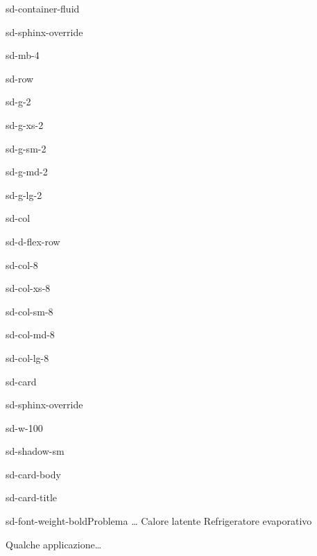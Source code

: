 \documentclass[letterpaper,10pt,italian]{jupyterBook}
\begin{document}
\begin{sphinxuseclass}{sd-container-fluid}
\begin{sphinxuseclass}{sd-sphinx-override}
\begin{sphinxuseclass}{sd-mb-4}
\begin{sphinxuseclass}{sd-row}
\begin{sphinxuseclass}{sd-g-2}
\begin{sphinxuseclass}{sd-g-xs-2}
\begin{sphinxuseclass}{sd-g-sm-2}
\begin{sphinxuseclass}{sd-g-md-2}
\begin{sphinxuseclass}{sd-g-lg-2}
\begin{sphinxuseclass}{sd-col}
\begin{sphinxuseclass}{sd-d-flex-row}
\begin{sphinxuseclass}{sd-col-8}
\begin{sphinxuseclass}{sd-col-xs-8}
\begin{sphinxuseclass}{sd-col-sm-8}
\begin{sphinxuseclass}{sd-col-md-8}
\begin{sphinxuseclass}{sd-col-lg-8}
\begin{sphinxuseclass}{sd-card}
\begin{sphinxuseclass}{sd-sphinx-override}
\begin{sphinxuseclass}{sd-w-100}
\begin{sphinxuseclass}{sd-shadow-sm}
\begin{sphinxuseclass}{sd-card-body}
\begin{sphinxuseclass}{sd-card-title}
\begin{sphinxuseclass}{sd-font-weight-bold}Problema … Calore latente \sphinxhyphen{} Refrigeratore evaporativo
\end{sphinxuseclass}
\end{sphinxuseclass}
\sphinxAtStartPar
Qualche applicazione…


\end{sphinxuseclass}
\end{sphinxuseclass}
\end{sphinxuseclass}
\end{sphinxuseclass}
\end{sphinxuseclass}
\end{sphinxuseclass}
\end{sphinxuseclass}
\end{sphinxuseclass}
\end{sphinxuseclass}
\end{sphinxuseclass}
\end{sphinxuseclass}
\end{sphinxuseclass}
\end{sphinxuseclass}
\end{sphinxuseclass}
\end{sphinxuseclass}
\end{sphinxuseclass}
\end{sphinxuseclass}
\end{sphinxuseclass}
\end{sphinxuseclass}
\end{sphinxuseclass}
\end{sphinxuseclass}
\end{document}
